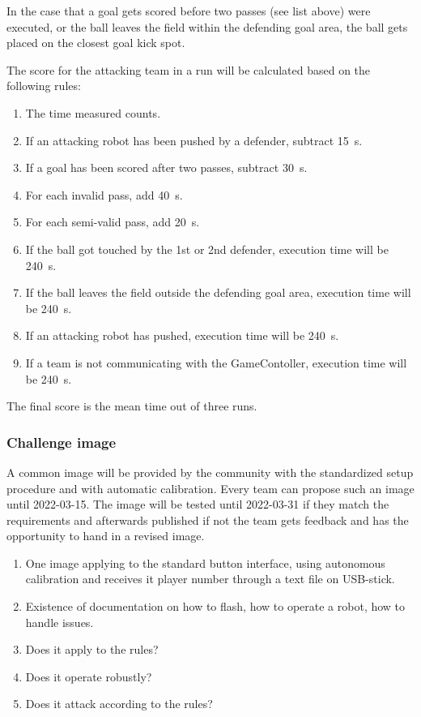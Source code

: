         In the case that a goal gets scored before two passes (see list above) were executed, or the ball leaves the field within the defending goal area, the ball gets placed on the closest goal kick spot.

        The score for the attacking team in a run will be calculated based on the following rules:

        \begin{enumerate}
            \item The time measured counts.
            \item If an attacking robot has been pushed by a defender, subtract \qty{15}{\second}.
            \item If a goal has been scored after two passes, subtract \qty{30}{\second}.
            \item For each invalid pass, add \qty{40}{\second}.
            \item For each semi-valid pass, add \qty{20}{\second}.
            \item If the ball got touched by the 1st or 2nd defender, execution time will be \qty{240}{\second}.
            \item If the ball leaves the field outside the defending goal area, execution time will be \qty{240}{\second}.
            \item If an attacking robot has pushed, execution time will be \qty{240}{\second}.
            \item If a team is not communicating with the GameContoller, execution time will be \qty{240}{\second}.
        \end{enumerate}

        The final score is the mean time out of three runs.

    \subsubsection{Challenge image}
        \label{sec:Challenge_image}
        A common image will be provided by the community with the standardized setup procedure and with automatic calibration. Every team can propose such an image until 2022-03-15. The image will be tested until 2022-03-31 if they match the requirements and afterwards published if not the team gets feedback and has the opportunity to hand in a revised image.

        \begin{enumerate}
            \item One image applying to the standard button interface, using autonomous calibration and receives it player number through a text file on USB-stick.
            \item Existence of documentation on how to flash, how to operate a robot, how to handle issues.
            \item Does it apply to the rules?
            \item Does it operate robustly?
            \item Does it attack according to the rules?
        \end{enumerate}

